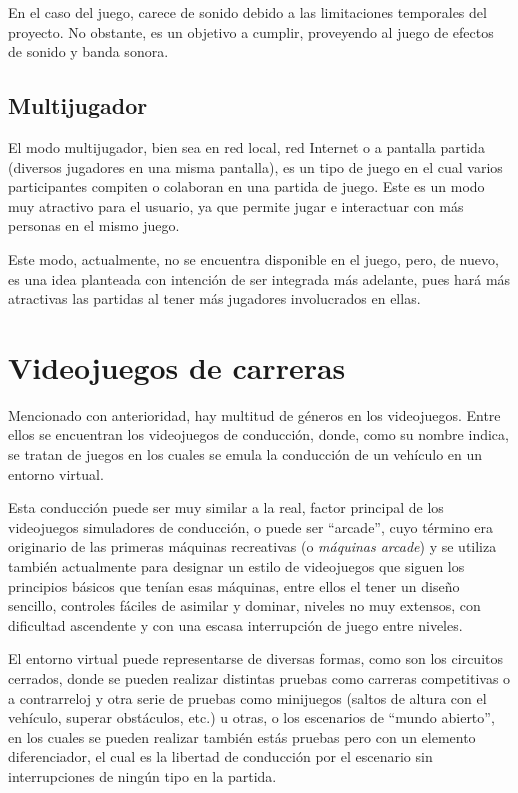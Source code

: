 En el caso del juego, carece de sonido debido a las limitaciones temporales del proyecto. No obstante, es un objetivo a cumplir, proveyendo al juego de efectos de sonido y banda sonora.

\subsection{Multijugador}

El modo multijugador, bien sea en red local, red Internet o a pantalla partida (diversos jugadores en una misma pantalla), es un tipo de juego en el cual varios participantes compiten o colaboran en una partida de juego. Este es un modo muy atractivo para el usuario, ya que permite jugar e interactuar con más personas en el mismo juego.

Este modo, actualmente, no se encuentra disponible en el juego, pero, de nuevo, es una idea planteada con intención de ser integrada más adelante, pues hará más atractivas las partidas al tener más jugadores involucrados en ellas.

\section{Videojuegos de carreras} 

Mencionado con anterioridad, hay multitud de géneros en los videojuegos. Entre ellos se encuentran los videojuegos de conducción, donde, como su nombre indica, se tratan de juegos en los cuales se emula la conducción de un vehículo en un entorno virtual. 

Esta conducción puede ser muy similar a la real, factor principal de los videojuegos simuladores de conducción, o puede ser ``arcade'', cuyo término era originario de las primeras máquinas recreativas (o \textit{máquinas arcade}) y se utiliza también actualmente para designar un estilo de videojuegos que siguen los principios básicos que tenían esas máquinas, entre ellos el tener un diseño sencillo, controles fáciles de asimilar y dominar, niveles no muy extensos, con dificultad ascendente y con una escasa interrupción de juego entre niveles.

El entorno virtual puede representarse de diversas formas, como son los circuitos cerrados, donde se pueden realizar distintas pruebas como carreras competitivas o a contrarreloj y otra serie de pruebas como minijuegos (saltos de altura con el vehículo, superar obstáculos, etc.) u otras, o los escenarios de ``mundo abierto'', en los cuales se pueden realizar también estás pruebas pero con un elemento diferenciador, el cual es la libertad de conducción por el escenario sin interrupciones de ningún tipo en la partida.

